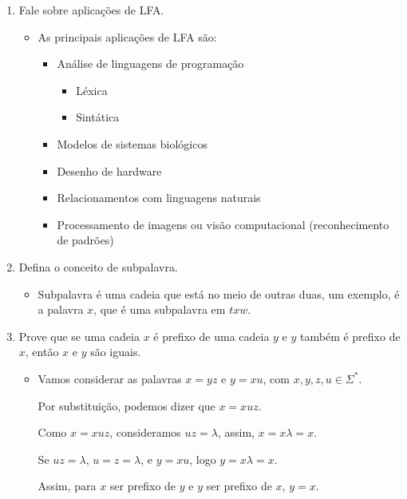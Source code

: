 \documentclass[12pt]{article}
\begin{document}
\begin{enumerate}
\begin{itemize}[label=R:]
        pelo modelo corresponde ao conjunto de todas as cadeias que ele é capaz 
        de gerar (linguagens/ERs)
    \end{itemize}
    \item Fale sobre aplicações de LFA.
    \begin{itemize}[label=R:]
        \item As principais aplicações de LFA são:
        \begin{itemize}
            \item Análise de linguagens de programação
            \begin{itemize}
                \item Léxica
                \item Sintática
            \end{itemize}
            \item Modelos de sistemas biológicos
            \item Desenho de hardware
            \item Relacionamentos com linguagens naturais
            \item Processamento de imagens ou visão computacional (reconhecimento 
            de padrões)
        \end{itemize}
    \end{itemize}
    \item Defina o conceito de subpalavra.
    \begin{itemize}[label=R:]
        \item Subpalavra é uma cadeia que está no meio de outras duas, um 
        exemplo, é a palavra $x$, que é uma subpalavra em $txw$. 
    \end{itemize}
    \item Prove que se uma cadeia $x$ é prefixo de uma cadeia $y$ e $y$ também é 
    prefixo de $x$, então $x$ e $y$ são iguais.
    \begin{itemize}[label=R:]
        \item Vamos considerar as palavras $x=yz$ e $y=xu$, com $x,y,z, u \in 
        \Sigma^*$.

        Por substituição, podemos dizer que $x=xuz$. 

        Como $x=xuz$, consideramos $uz=\lambda$, assim, $x=x\lambda=x$.

        Se $uz=\lambda$, $u=z=\lambda$, e $y=xu$, logo $y=x\lambda=x$.

        Assim, para $x$ ser prefixo de $y$ e $y$ ser prefixo de $x$, $y=x$.


\end{itemize}
\end{enumerate}
\end{document}
